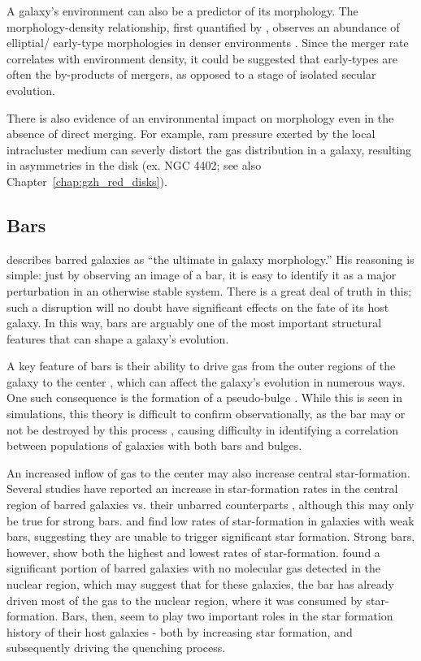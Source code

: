 A galaxy's environment can also be a predictor of its morphology. The morphology-density relationship, first quantified by \citet{Dressler1980}, observes an abundance of elliptial/ early-type morphologies in denser environments \citep{deSouza1982,Postman1984}. Since the merger rate correlates with environment density, it could be suggested that early-types are often the by-products of mergers, as opposed to a stage of isolated secular evolution. 

There is also evidence of an environmental impact on morphology even in the absence of direct merging. For example, ram pressure \citep{Gunn1972} exerted by the local intracluster medium can severly distort the gas distribution in a galaxy, resulting in asymmetries in the disk (ex. NGC 4402; see also Chapter~\ref{chap:gzh_red_disks}).  

\subsection{Bars}
\citet{Buta2013} describes barred galaxies as ``the ultimate in galaxy morphology.'' His reasoning is simple: just by observing an image of a bar, it is easy to identify it as a major perturbation in an otherwise stable system. There is a great deal of truth in this; such a disruption will no doubt have significant effects on the fate of its host galaxy. In this way, bars are arguably one of the most important structural features that can shape a galaxy's evolution. 

A key feature of bars is their ability to drive gas from the outer regions of the galaxy to the center \citep{Athanassoula1992,Friedli1993,Sellwood1993,Shlosman1989,Ann2005}, which can affect the galaxy's evolution in numerous ways. One such consequence is the formation of a pseudo-bulge \citet{Kormendy2004,Sheth2005}. While this is seen in simulations, this theory is difficult to confirm observationally, as the bar may or not be destroyed by this process \citet{Athanassoula2005}, causing difficulty in identifying a correlation between populations of galaxies with both bars and bulges. 

An increased inflow of gas to the center may also increase central star-formation. Several studies have reported an increase in star-formation rates in the central region of barred galaxies vs. their unbarred counterparts \citep{Hawarden1986,Ho1997}, although this may only be true for strong bars. \citet{Martinet1997} and \citet{Zhou2014} find low rates of star-formation in galaxies with weak bars, suggesting they are unable to trigger significant star formation. Strong bars, however, show both the highest and lowest rates of star-formation. \citep{Sheth2005} found a significant portion of barred galaxies with no molecular gas detected in the nuclear region, which may suggest that for these galaxies, the bar has already driven most of the gas to the nuclear region, where it was consumed by star-formation. Bars, then, seem to play two important roles in the star formation history of their host galaxies - both by increasing star formation, and subsequently driving the quenching process.

